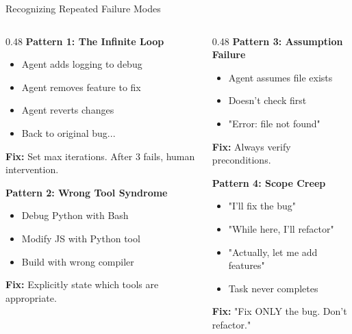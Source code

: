 \documentclass[aspectratio=169,11pt]{beamer}
\begin{document}
\begin{frame}{Recognizing Repeated Failure Modes}
    \begin{columns}[T]
        \begin{column}{0.48\textwidth}
            \textbf{Pattern 1: The Infinite Loop}
            \begin{itemize}
                \item Agent adds logging to debug
                \item Agent removes feature to fix
                \item Agent reverts changes
                \item Back to original bug...
            \end{itemize}
            \textcolor{UofSCGarnet}{\textbf{Fix:}} Set max iterations. After 3 fails, human intervention.

            \vspace{0.3cm}
            \textbf{Pattern 2: Wrong Tool Syndrome}
            \begin{itemize}
                \item Debug Python with Bash
                \item Modify JS with Python tool
                \item Build with wrong compiler
            \end{itemize}
            \textcolor{UofSCGarnet}{\textbf{Fix:}} Explicitly state which tools are appropriate.
        \end{column}
        \begin{column}{0.48\textwidth}
            \textbf{Pattern 3: Assumption Failure}
            \begin{itemize}
                \item Agent assumes file exists
                \item Doesn't check first
                \item "Error: file not found"
            \end{itemize}
            \textcolor{UofSCGarnet}{\textbf{Fix:}} Always verify preconditions.

            \vspace{0.3cm}
            \textbf{Pattern 4: Scope Creep}
            \begin{itemize}
                \item "I'll fix the bug"
                \item "While here, I'll refactor"
                \item "Actually, let me add features"
                \item Task never completes
            \end{itemize}
            \textcolor{UofSCGarnet}{\textbf{Fix:}} "Fix ONLY the bug. Don't refactor."
        \end{column}
    \end{columns}
\end{frame}
\end{document}
